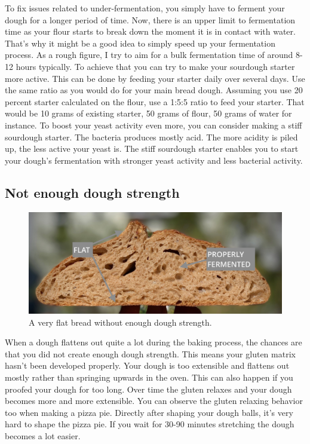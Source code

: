 To fix issues related to under-fermentation, you simply have to ferment your dough
for a longer period of time. Now, there is an upper limit to fermentation time
as your flour starts to break down the moment it is in contact with water. That's why it
might be a good idea to simply speed up your fermentation process. As a rough
figure, I try to aim for a bulk fermentation time of around 8-12 hours typically.
To achieve that you can try to make your sourdough starter more active.  This can be done
by feeding your starter daily over several days. Use the same ratio as you would
do for your main bread dough. Assuming you use 20 percent starter calculated on the flour,
use a 1:5:5 ratio to feed your starter. That would be 10 grams of existing starter,
50 grams of flour, 50 grams of water for instance.
To boost your yeast activity even more, you can consider making a stiff sourdough 
starter. The bacteria produces mostly acid. The more acidity
is piled up, the less active your yeast is. The stiff sourdough starter
enables you to start your dough's fermentation with stronger yeast activity
and less bacterial activity.

\subsection{Not enough dough strength}

\begin{figure}
  \includegraphics[width=\textwidth]{flat-bread}
  \caption{A very flat bread without enough dough strength.}
  \label{flat-bread}
\end{figure}

When a dough flattens out quite a lot during the baking process, the chances are
that you did not create enough dough strength. This means your gluten matrix
hasn't been developed properly. Your dough is too extensible and flattens out
mostly rather than springing upwards in the oven. This can also happen if you
proofed your dough for too long. Over time the gluten relaxes and your dough
becomes more and more extensible. You can observe the gluten relaxing behavior
too when making a pizza pie. Directly after shaping your dough balls, it's very hard to shape
the pizza pie. If you wait for 30-90 minutes stretching the dough becomes a lot easier.

